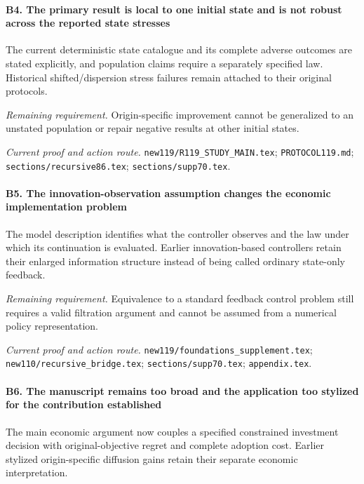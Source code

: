 \paragraph{B4. The primary result is local to one initial state and is not robust across the reported state stresses}

The current deterministic state catalogue and its complete adverse outcomes are stated explicitly, and population claims require a separately specified law. Historical shifted/\allowbreak{}dispersion stress failures remain attached to their original protocols.

\par\emph{Remaining requirement.} Origin-specific improvement cannot be generalized to an unstated population or repair negative results at other initial states.

\par\emph{Current proof and action route.} \nolinkurl{new119/R119_STUDY_MAIN.tex}; \nolinkurl{PROTOCOL119.md}; \nolinkurl{sections/recursive86.tex}; \nolinkurl{sections/supp70.tex}.

\paragraph{B5. The innovation-observation assumption changes the economic implementation problem}

The model description identifies what the controller observes and the law under which its continuation is evaluated. Earlier innovation-based controllers retain their enlarged information structure instead of being called ordinary state-only feedback.

\par\emph{Remaining requirement.} Equivalence to a standard feedback control problem still requires a valid filtration argument and cannot be assumed from a numerical policy representation.

\par\emph{Current proof and action route.} \nolinkurl{new119/foundations_supplement.tex}; \nolinkurl{new110/recursive_bridge.tex}; \nolinkurl{sections/supp70.tex}; \nolinkurl{appendix.tex}.

\paragraph{B6. The manuscript remains too broad and the application too stylized for the contribution established}

The main economic argument now couples a specified constrained investment decision with original-objective regret and complete adoption cost. Earlier stylized origin-specific diffusion gains retain their separate economic interpretation.

